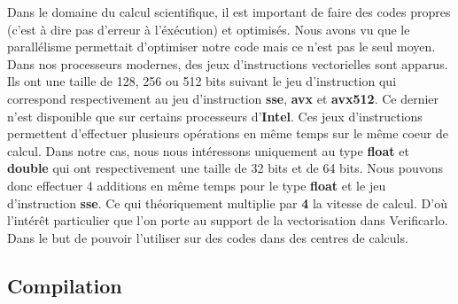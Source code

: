 \documentclass[11pt]{article}
\begin{document}
Dans le domaine du calcul scientifique, il est important de faire
des codes propres (c'est à dire pas d'erreur à l'éxécution) et
optimisés.
\vspace{5mm}
Nous avons vu que le parallélisme permettait d'optimiser notre code
mais ce n'est pas le seul moyen.
\vspace{5mm}
Dans nos processeurs modernes, des jeux d'instructions vectorielles
sont apparus. Ils ont une taille de 128, 256 ou 512 bits suivant le
jeu d'instruction qui correspond respectivement au jeu
d'instruction \textbf{sse}, \textbf{avx} et \textbf{avx512}. Ce dernier n'est disponible
que sur certains processeurs d'\textbf{Intel}. Ces jeux d'instructions
permettent d'effectuer plusieurs opérations en même temps sur le
même coeur de calcul.
\vspace{5mm}
Dans notre cas, nous nous intéressons uniquement au type \textbf{float} et
\textbf{double} qui ont respectivement une taille de 32 bits et de 64
bits.
\vspace{5mm}
Nous pouvons donc effectuer 4 additions en même temps pour le type
\textbf{float} et le jeu d'instruction \textbf{sse}. Ce qui théoriquement
multiplie par \textbf{4} la vitesse de calcul. D'où l'intérêt particulier
que l'on porte au support de la vectorisation dans
Verificarlo. Dans le but de pouvoir l'utiliser sur des codes dans
des centres de calculs.

\subsection{Compilation}
\label{sec:org6f5bd66}
\end{document}
